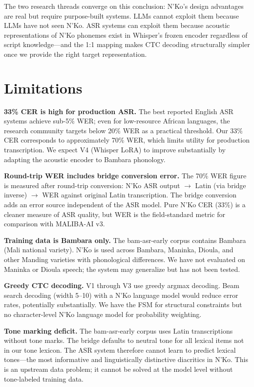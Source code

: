 \documentclass[11pt]{article}
\begin{document}
The two research threads converge on this conclusion: N'Ko's design advantages are real but require purpose-built systems.
LLMs cannot exploit them because LLMs have not seen N'Ko.
ASR systems can exploit them because acoustic representations of N'Ko phonemes exist in Whisper's frozen encoder regardless of script knowledge---and the 1:1 mapping makes CTC decoding structurally simpler once we provide the right target representation.

\section{Limitations}

\textbf{33\% CER is high for production ASR.}
The best reported English ASR systems achieve sub-5\% WER; even for low-resource African languages, the research community targets below 20\% WER as a practical threshold.
Our 33\% CER corresponds to approximately 70\% WER, which limits utility for production transcription.
We expect V4 (Whisper LoRA) to improve substantially by adapting the acoustic encoder to Bambara phonology.

\textbf{Round-trip WER includes bridge conversion error.}
The 70\% WER figure is measured after round-trip conversion: N'Ko ASR output $\to$ Latin (via bridge inverse) $\to$ WER against original Latin transcription.
The bridge conversion adds an error source independent of the ASR model.
Pure N'Ko CER (33\%) is a cleaner measure of ASR quality, but WER is the field-standard metric for comparison with MALIBA-AI v3.

\textbf{Training data is Bambara only.}
The bam-asr-early corpus contains Bambara (Mali national variety).
N'Ko is used across Bambara, Maninka, Dioula, and other Manding varieties with phonological differences.
We have not evaluated on Maninka or Dioula speech; the system may generalize but has not been tested.

\textbf{Greedy CTC decoding.}
V1 through V3 use greedy argmax decoding.
Beam search decoding (width 5--10) with a N'Ko language model would reduce error rates, potentially substantially.
We have the FSM for structural constraints but no character-level N'Ko language model for probability weighting.

\textbf{Tone marking deficit.}
The bam-asr-early corpus uses Latin transcriptions without tone marks.
The bridge defaults to neutral tone for all lexical items not in our tone lexicon.
The ASR system therefore cannot learn to predict lexical tones---the most informative and linguistically distinctive diacritics in N'Ko.
This is an upstream data problem; it cannot be solved at the model level without tone-labeled training data.
\end{document}
